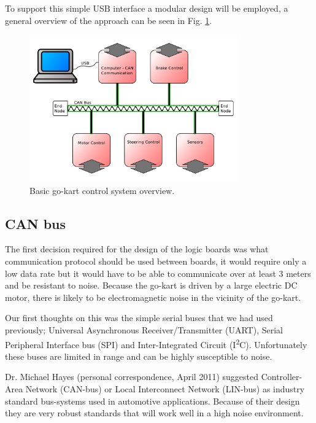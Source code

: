 To support this simple USB interface a modular design will be employed, a
general overview of the approach can be seen in Fig. \ref{can-design}.

\begin{figure}
  \centering
  \includegraphics[width=0.8\textwidth]{../../Images/can_diagram.pdf}
  \caption{Basic go-kart control system overview.\label{can-design}}
\end{figure}

\subsection{CAN bus}

The first decision required for the design of the logic boards was what
communication protocol should be used between boards, it would require only a
low data rate but it would have to be able to communicate over at least 3 meters
and be resistant to noise.  Because the go-kart is driven by a large electric DC
motor, there is likely to be electromagnetic noise in the vicinity of the
go-kart.

Our first thoughts on this was the simple serial buses that we had used
previously; Universal Asynchronous Receiver/Transmitter (UART), Serial
Peripheral Interface bus (SPI) and Inter-Integrated Circuit
(I\textsuperscript{2}C).  Unfortunately these buses are limited in range and can
be highly susceptible to noise.

Dr. Michael Hayes (personal correspondence, April 2011) suggested
Controller-Area Network (CAN-bus) or Local Interconnect Network (LIN-bus) as
industry standard bus-systems used in automotive applications.  Because of their
design they are very robust standards that will work well in a high noise
environment.

